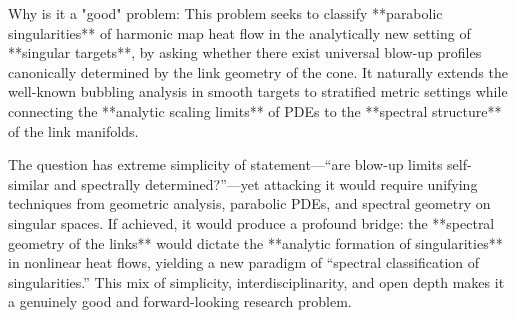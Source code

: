 Why is it a "good" problem:  
This problem seeks to classify **parabolic singularities** of harmonic map heat flow in the analytically new setting of **singular targets**, by asking whether there exist universal blow-up profiles canonically determined by the link geometry of the cone.  It naturally extends the well-known bubbling analysis in smooth targets to stratified metric settings while connecting the **analytic scaling limits** of PDEs to the **spectral structure** of the link manifolds.

The question has extreme simplicity of statement—“are blow-up limits self-similar and spectrally determined?”—yet attacking it would require unifying techniques from geometric analysis, parabolic PDEs, and spectral geometry on singular spaces.  If achieved, it would produce a profound bridge: the **spectral geometry of the links** would dictate the **analytic formation of singularities** in nonlinear heat flows, yielding a new paradigm of “spectral classification of singularities.”  This mix of simplicity, interdisciplinarity, and open depth makes it a genuinely good and forward-looking research problem.